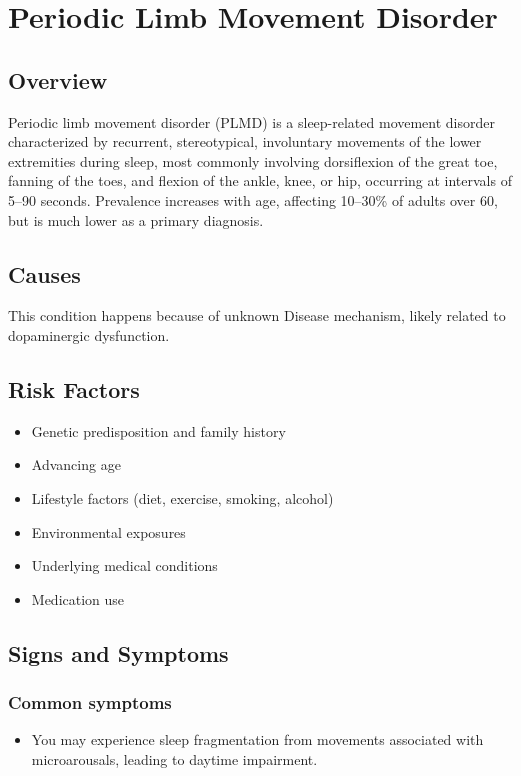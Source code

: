 \chapter{Periodic Limb Movement Disorder}
\label{sec:Periodic Limb Movement Disorder}

\section{Overview}
Periodic limb movement disorder (PLMD) is a sleep-related movement disorder characterized by recurrent, stereotypical, involuntary movements of the lower extremities during sleep, most commonly involving dorsiflexion of the great toe, fanning of the toes, and flexion of the ankle, knee, or hip, occurring at intervals of 5--90 seconds. Prevalence increases with age, affecting 10--30\% of adults over 60, but is much lower as a primary diagnosis.
\section{Causes}
This condition happens because of unknown Disease mechanism, likely related to dopaminergic dysfunction.     
\section{Risk Factors}

\begin{itemize}[noitemsep]
  \item Genetic predisposition and family history
  \item Advancing age
  \item Lifestyle factors (diet, exercise, smoking, alcohol)
  \item Environmental exposures
  \item Underlying medical conditions
  \item Medication use
\end{itemize}
\section{Signs and Symptoms}

\subsection{Common symptoms}
\begin{itemize}[noitemsep]
  \item You may experience sleep fragmentation from movements associated with microarousals, leading to daytime impairment. 
  \end{itemize}

